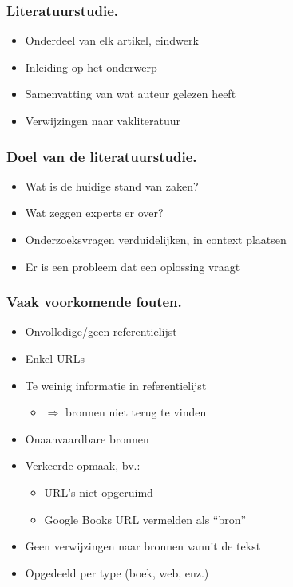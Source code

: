 \documentclass[aspectratio=169]{beamer}
\begin{document}
\begin{frame}
  \frametitle{Literatuurstudie.}

  \begin{itemize}
    \item Onderdeel van elk artikel, eindwerk
    \item Inleiding op het onderwerp
    \item Samenvatting van wat auteur gelezen heeft
    \item Verwijzingen naar vakliteratuur
  \end{itemize}

\end{frame}

\begin{frame}
  \frametitle{Doel van de literatuurstudie.}

  \begin{itemize}
    \item Wat is de huidige stand van zaken?
    \item Wat zeggen experts er over?
    \item Onderzoeksvragen verduidelijken, in context plaatsen
    \item Er is een probleem dat een oplossing vraagt
  \end{itemize}

  \bigskip

\end{frame}

\begin{frame}
  \frametitle{Vaak voorkomende fouten.}

  \begin{itemize}
    \item Onvolledige/geen referentielijst
    \item Enkel URLs
    \item Te weinig informatie in referentielijst
          \begin{itemize}
            \item \(\Rightarrow\) bronnen niet terug te vinden
          \end{itemize}
    \item Onaanvaardbare bronnen
    \item Verkeerde opmaak, bv.:
          \begin{itemize}
            \item URL's niet opgeruimd
            \item Google Books URL vermelden als ``bron''
          \end{itemize}
    \item Geen verwijzingen naar bronnen vanuit de tekst
    \item Opgedeeld per type (boek, web, enz.)
  \end{itemize}
\end{frame}
\end{document}
